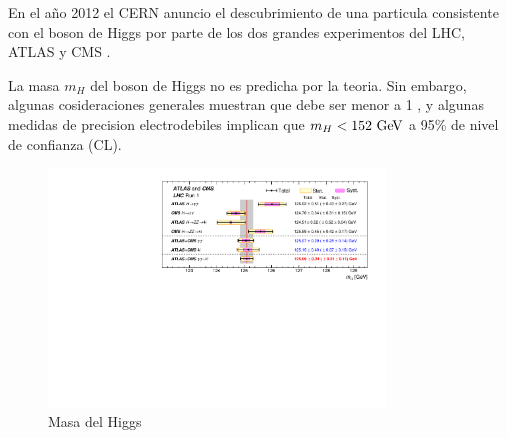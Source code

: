 En el a\~no 2012 el CERN anuncio el descubrimiento de una particula
consistente con el boson de Higgs por parte de los dos grandes
experimentos del LHC, ATLAS y CMS \cite{Aad:2012tfa,Chatrchyan:2012ufa}.

La masa $m_H$ del boson de Higgs no es predicha por la teoria. Sin embargo,
algunas cosideraciones generales muestran que debe ser menor a 1 \tev, y
algunas medidas de precision electrodebiles implican que $m_H < 152 \gev$ a
95\% de nivel de confianza (CL).

\begin{figure}[!ht]
  \centering
  \includegraphics[width=0.8\textwidth]{figures/higgs_atlas_cms_mass}
  \caption{Masa del Higgs}
  \label{fig:higgs_cms_atlas}
\end{figure}






